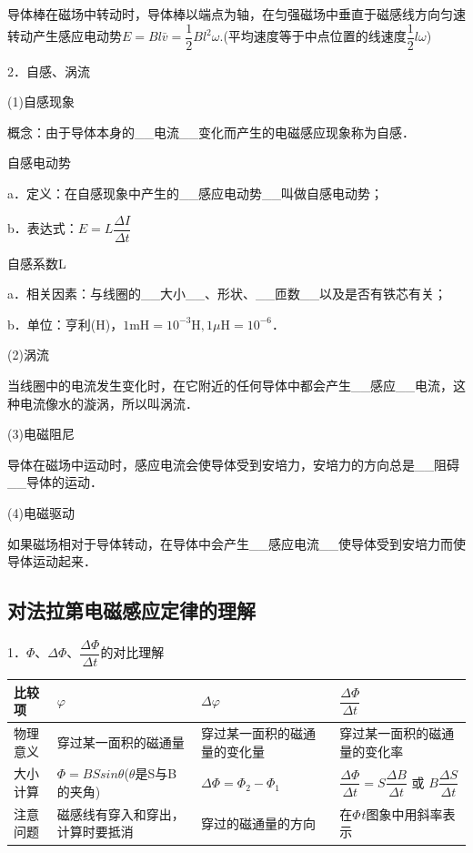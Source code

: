 导体棒在磁场中转动时，导体棒以端点为轴，在匀强磁场中垂直于磁感线方向匀速转动产生感应电动势$E=B l \bar{v}=\dfrac{1}{2}Bl^2\omega$.(平均速度等于中点位置的线速度$\dfrac{1}{2} l \omega$)

2．自感、涡流

(1)自感现象

概念：由于导体本身的\_\_电流\_\_变化而产生的电磁感应现象称为自感．

自感电动势

a．定义：在自感现象中产生的\_\_感应电动势\_\_叫做自感电动势；

b．表达式：$E=L \dfrac{\Delta I}{\Delta t}$

自感系数L

a．相关因素：与线圈的\_\_大小\_\_、形状、\_\_匝数\_\_以及是否有铁芯有关；

b．单位：亨利(H)，$1 \mathrm{mH}=10^{-3} \mathrm{H}, 1 \mu \mathrm{H}=10^{-6}$．

(2)涡流

当线圈中的电流发生变化时，在它附近的任何导体中都会产生\_\_感应\_\_电流，这种电流像水的漩涡，所以叫涡流．

(3)电磁阻尼

导体在磁场中运动时，感应电流会使导体受到安培力，安培力的方向总是\_\_阻碍\_\_导体的运动．

(4)电磁驱动

如果磁场相对于导体转动，在导体中会产生\_\_感应电流\_\_使导体受到安培力而使导体运动起来．
\newpage
\subsection{对法拉第电磁感应定律的理解}

1．$\Phi$、$\Delta \Phi$、$\dfrac{\Delta \Phi}{\Delta t}$的对比理解

\begin{longtable}[]{@{}m{1.5cm}m{3.7cm}m{3.2cm}m{3.7cm}@{}}
\toprule
比较项 & $\varphi$ & $\Delta \varphi$ &$\dfrac{\Delta \Phi}{\Delta t}$\tabularnewline
\midrule
\endhead
物理意义 & 穿过某一面积的磁通量 & 穿过某一面积的磁通量的变化量 &
穿过某一面积的磁通量的变化率\tabularnewline
大小计算 & $\Phi=BSsin \theta$($\theta$是S与B的夹角) & $\Delta \Phi=\Phi_2-\Phi_1 $&
$\dfrac{\Delta \Phi}{\Delta t}=S \dfrac{\Delta B}{\Delta t}$ 或 $B \dfrac{\Delta S}{\Delta t}$\tabularnewline
注意问题 & 磁感线有穿入和穿出，计算时要抵消 & 穿过的磁通量的方向 &
在$\Phi_­t$图象中用斜率表示\tabularnewline
\bottomrule
\end{longtable}

